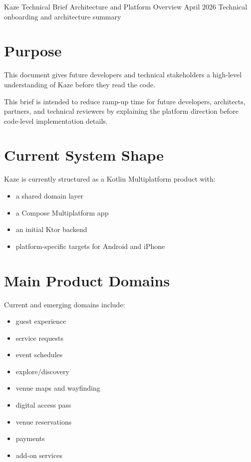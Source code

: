 \documentclass[11pt,a4paper]{article}
\begin{document}
\KazeCover
  {Kaze Technical Brief}
  {Architecture and Platform Overview}
  {April 2026}
  {Technical onboarding and architecture summary}

\KazeDocumentNotice

\section{Purpose}

This document gives future developers and technical stakeholders a high-level understanding of Kaze before they read the code.

\begin{kazecalloutbox}
This brief is intended to reduce ramp-up time for future developers, architects, partners, and technical reviewers by explaining the platform direction before code-level implementation details.
\end{kazecalloutbox}

\section{Current System Shape}

Kaze is currently structured as a Kotlin Multiplatform product with:
\begin{itemize}
    \item a shared domain layer
    \item a Compose Multiplatform app
    \item an initial Ktor backend
    \item platform-specific targets for Android and iPhone
\end{itemize}

\section{Main Product Domains}

Current and emerging domains include:
\begin{itemize}
    \item guest experience
    \item service requests
    \item event schedules
    \item explore/discovery
    \item venue maps and wayfinding
    \item digital access pass
    \item venue reservations
    \item payments
    \item add-on services
\end{itemize}
\end{document}
